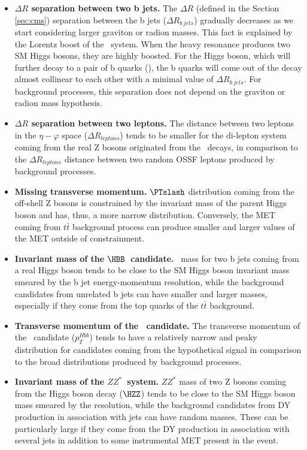\begin{itemize}

\item{\bfseries $\Delta R$ separation between two b jets.}
The $\Delta R$ (defined in the Section \ref{sec:cms}) separation between the b jets ($\Delta R_{b\ jets}$) gradually decreases as we start considering larger graviton or radion masses. This fact is explained by the Lorentz boost of the \HBB~system. When the heavy resonance produces two SM Higgs bosons, they are highly boosted. For the Higgs boson, which will further decay to a pair of b quarks (\HBB), the b quarks will come out of the decay almost collinear to each other with a minimal value of $\Delta R_{b\ jets}$. For background processes, this separation does not depend on the graviton or radion mass hypothesis. 

\item{\bfseries $\Delta R$ separation between two leptons.}
The distance between two leptons in the $\eta - \varphi$ space ($\Delta R_{leptons}$) tends to be smaller for the di-lepton system coming from the real Z bosons originated from the \HZZ~decays, in comparison to the $\Delta R_{leptons}$ distance between two random OSSF leptons produced by background processes. 

\item{\bfseries Missing transverse momentum.}
$\PTslash$ distribution coming from the off-shell Z bosons is constrained by the invariant mass of the parent Higgs boson and has, thus, a more narrow distribution. Conversely, the MET coming from $t\bar{t}$ background process can produce smaller and larger values of the MET outside of constrainment. 

\item{\bfseries Invariant mass of the $\HBB$~candidate.} 
\HBB~mass for two b jets coming from a real Higgs boson tends to be close to the SM Higgs boson invariant mass smeared by the b jet energy-momentum resolution, while the background candidates from unrelated b jets can have smaller and larger masses, especially if they come from the top quarks of the $t\bar{t}$ background.

\item{\bfseries Transverse momentum of the \HBB~candidate.} 
The transverse momentum of the \HBB~candidate ($p_T^{Hbb}$) tends to have a relatively narrow and peaky distribution for candidates coming from the hypothetical signal in comparison to the broad distributions produced by background processes. 

\item{\bfseries Invariant mass of the $ZZ^*$~system.} 
$ZZ^*$ mass of two Z bosons coming from the Higgs boson decay ($\HZZ$) tends to be close to the SM Higgs boson mass smeared by the \PTslash resolution, while the background candidates from DY production in association with jets can have random masses. These can be particularly large if they come from the DY production in association with several jets in addition to some instrumental MET present in the event.


\end{itemize}
